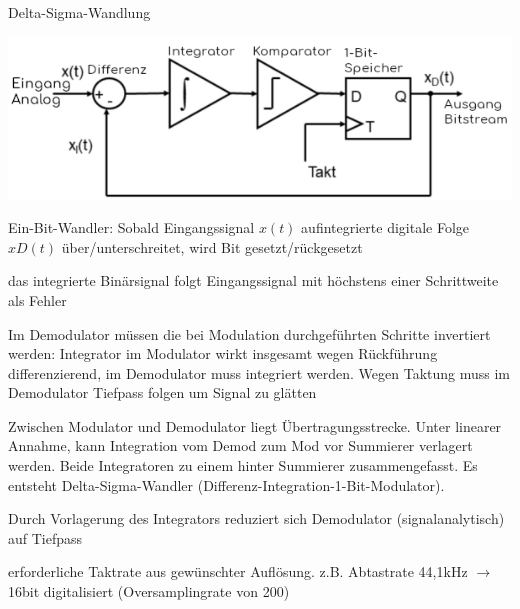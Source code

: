 \documentclass[a4paper]{article}
\begin{document}
\begin{multicols}{3}
  Delta-Sigma-Wandlung
  \begin{center}
    \includegraphics[width=.4\linewidth]{Assets/Biosignalverarbeitung-Delta-Sigma-Wandler.png}
  \end{center}
  \begin{itemize*}
    \item Ein-Bit-Wandler: Sobald Eingangssignal $x(t)$ aufintegrierte digitale Folge $xD(t)$ über/unterschreitet, wird Bit gesetzt/rückgesetzt
    \item das integrierte Binärsignal folgt Eingangssignal mit höchstens einer Schrittweite als Fehler
    \item Im Demodulator müssen die bei Modulation durchgeführten Schritte invertiert werden: Integrator im Modulator wirkt insgesamt wegen Rückführung differenzierend, im Demodulator muss integriert werden. Wegen Taktung muss im Demodulator Tiefpass folgen um Signal zu glätten
    \item Zwischen Modulator und Demodulator liegt Übertragungsstrecke. Unter linearer Annahme, kann Integration vom Demod zum Mod vor Summierer verlagert werden. Beide Integratoren zu einem hinter Summierer zusammengefasst. Es entsteht Delta-Sigma-Wandler (Differenz-Integration-1-Bit-Modulator).
    \item Durch Vorlagerung des Integrators reduziert sich Demodulator (signalanalytisch) auf Tiefpass
    \item erforderliche Taktrate aus gewünschter Auflösung. z.B. Abtastrate 44,1kHz $\rightarrow$ 16bit digitalisiert %
    (Oversamplingrate von 200)
  \end{itemize*}


\end{multicols}
\end{document}
